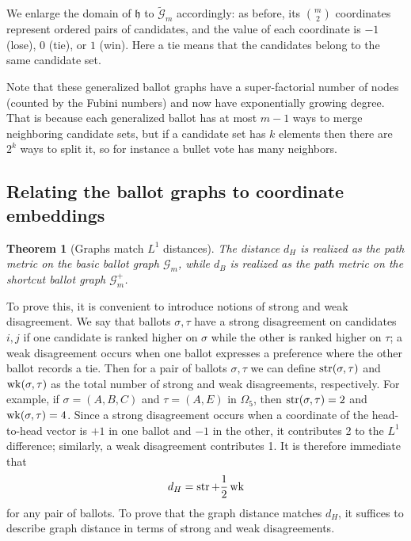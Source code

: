 \documentclass{amsart}
\newcommand{\G}{\mathcal{G}}
\newcommand{\WG}{\widetilde{\mathcal{G}}}
\newcommand{\str}{\mathop{\rm str}}
\newcommand{\wk}{\mathop{\rm wk}}
\newcommand{\hh}{\mathfrak{h}}
\theoremstyle{plain}
\newtheorem{theorem}{Theorem}[section]
\theoremstyle{definition}
\theoremstyle{remark}
\begin{document}
We enlarge the domain of $\hh$ to 
$\WG_m$ accordingly:  as before, its ${\binom m2}$ coordinates represent ordered pairs of candidates, and the value of each coordinate is $-1$ (lose), $0$ (tie), or $1$ (win).  Here a tie means that the candidates belong to the same candidate set.  

Note that these generalized ballot graphs have a super-factorial number of nodes (counted by the Fubini numbers) and now have exponentially growing degree. That is because each generalized ballot has at most $m-1$ ways to merge neighboring candidate sets, but if a candidate set has $k$ elements then there are $2^k$ ways to split it, so for instance a bullet vote has many neighbors.  

\subsection{Relating the ballot graphs to coordinate embeddings}

\begin{theorem}[Graphs match $L^1$ distances]\label{T:L1}
The distance $d_H$ is realized as the path metric on the basic ballot graph $\G_m$, while $d_B$ is realized as the path metric on the shortcut ballot graph $\G_m^+$.  
\end{theorem}

To prove this, it is convenient to introduce notions of strong and weak disagreement.
We say that ballots $\sigma,\tau$ have a strong disagreement on candidates $i,j$ if one candidate is ranked higher on $\sigma$ while the other is ranked higher on $\tau$; a weak disagreement occurs when one ballot expresses a preference where the other ballot records a tie.  Then for a pair of ballots $\sigma,\tau$ we can define 
$\str(\sigma,\tau)$ and $\wk(\sigma,\tau)$ as the total number of strong and weak disagreements, respectively.  
For example, if $\sigma=(A,B,C)$ and $\tau=(A,E)$ in $\Omega_5$, then $\str(\sigma,\tau)=2$ and $\wk(\sigma,\tau)=4$.  
Since a strong disagreement occurs when a coordinate of the head-to-head vector is $+1$ in one ballot and $-1$ in the other, it contributes 2 to the $L^1$ difference; similarly, a weak disagreement contributes 1.  It is therefore immediate that 
$$d_H=\str+\frac 12 \wk$$
for any pair of ballots.  To prove that the graph distance matches $d_H$, it suffices to describe graph distance in terms of strong and weak disagreements.
\end{document}
